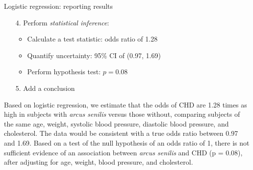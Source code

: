 \documentclass[10pt,t]{beamer}
\begin{document}
\begin{frame}{Logistic regression: reporting results}
	\begin{enumerate}
		\item[4.] Perform \textit{statistical inference}:
		\begin{itemize}
			\item Calculate a test statistic: odds ratio of 1.28
			\item Quantify uncertainty: 95\% CI of (0.97, 1.69)
			\item Perform hypothesis test: $p = 0.08$
		\end{itemize}
		\item[5.] Add a conclusion
	\end{enumerate}
	Based on logistic regression, we estimate that the odds of CHD are 1.28 times as high in subjects with \textit{arcus senilis} versus those without, comparing subjects of the same age, weight, systolic blood pressure, diastolic blood pressure, and cholesterol. The data would be consistent with a true odds ratio between 0.97 and 1.69. Based on a test of the null hypothesis of an odds ratio of 1, there is not sufficient evidence of an association between \textit{arcus senilis} and CHD (p = 0.08), after adjusting for age, weight, blood pressure, and cholesterol. 
\end{frame}

%	
%	 
\end{document}
